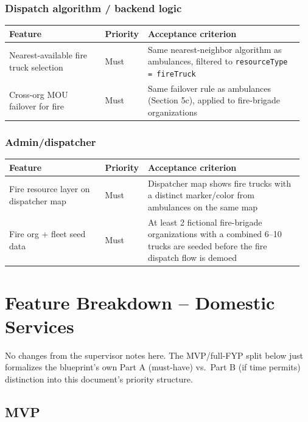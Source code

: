 \documentclass[11pt,a4paper]{article}
\begin{document}
\subsubsection{Dispatch algorithm / backend logic}

\begin{longtable}{p{0.32\linewidth} p{0.12\linewidth} p{0.52\linewidth}}
\toprule
\textbf{Feature} & \textbf{Priority} & \textbf{Acceptance criterion} \\
\midrule
\endhead
Nearest-available fire truck selection & Must & Same nearest-neighbor algorithm as ambulances, filtered to \texttt{resourceType = fireTruck} \\
\addlinespace
Cross-org MOU failover for fire & Must & Same failover rule as ambulances (Section 5c), applied to fire-brigade organizations \\
\bottomrule
\end{longtable}

\subsubsection{Admin/dispatcher}

\begin{longtable}{p{0.32\linewidth} p{0.12\linewidth} p{0.52\linewidth}}
\toprule
\textbf{Feature} & \textbf{Priority} & \textbf{Acceptance criterion} \\
\midrule
\endhead
Fire resource layer on dispatcher map & Must & Dispatcher map shows fire trucks with a distinct marker/color from ambulances on the same map \\
\addlinespace
Fire org + fleet seed data & Must & At least 2 fictional fire-brigade organizations with a combined 6--10 trucks are seeded before the fire dispatch flow is demoed \\
\bottomrule
\end{longtable}

\section{Feature Breakdown -- Domestic Services}

No changes from the supervisor notes here. The MVP/full-FYP split below just formalizes the blueprint's own Part A (must-have) vs.\ Part B (if time permits) distinction into this document's priority structure.

\subsection{MVP}
\end{document}
